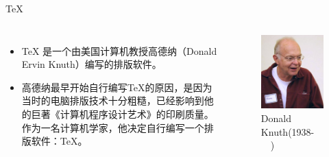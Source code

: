 \documentclass[13pt]{ctexbeamer}
\begin{document}
\begin{frame}{TeX}
	
	
	\begin{columns}[c]  %
		
		\column{6cm}
		
		\begin{itemize}
			\item
			TeX
			是一个由美国计算机教授高德纳（Donald Ervin Knuth）编写的排版软件。
			
			\item 高德纳最早开始自行编写TeX的原因，是因为当时的电脑排版技术十分粗糙，已经影响到他的巨著《计算机程序设计艺术》的印刷质量。作为一名计算机学家，他决定自行编写一个排版软件：TeX。
		\end{itemize}
		
		
		\column{5cm} 
		\begin{figure}[p]
			\includegraphics[scale=0.5]{Knuth.jpg}
			\caption{Donald Knuth(1938-~~)}
		\end{figure}
		
	\end{columns}
	
	
\end{frame}
\end{document}
